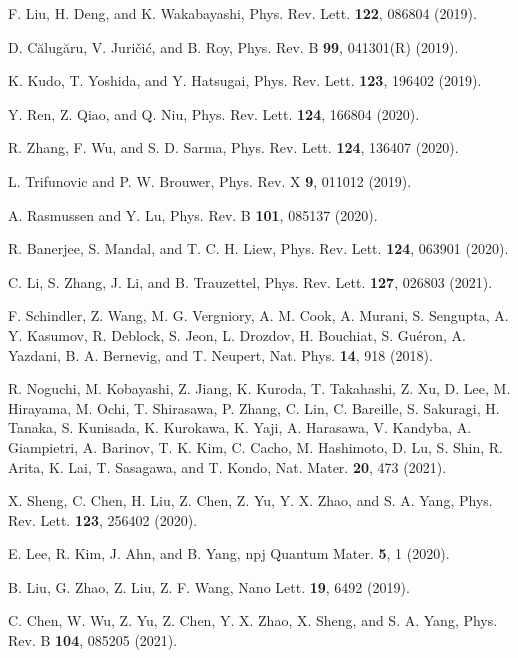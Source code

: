 \documentclass[aps,prl,twocolumn,showpacs,superscriptaddress]{revtex4-1}
\begin{document}
\begin{thebibliography}{99}
F. Liu, H. Deng, and K. Wakabayashi, Phys. Rev. Lett. \textbf{122}, 086804 (2019).

D. C\u{a}lug\u{a}ru, V. Juri\v{c}i\'{c}, and B. Roy, Phys. Rev. B \textbf{99}, 041301(R) (2019).%

K. Kudo, T. Yoshida, and Y. Hatsugai, Phys. Rev. Lett. \textbf{123}, 196402 (2019).

Y. Ren, Z. Qiao, and Q. Niu, Phys. Rev. Lett. \textbf{124}, 166804 (2020).

R. Zhang, F. Wu, and S. D. Sarma, Phys. Rev. Lett. \textbf{124}, 136407 (2020).

L. Trifunovic and P. W. Brouwer, Phys. Rev. X \textbf{9}, 011012 (2019).

A. Rasmussen and Y. Lu, Phys. Rev. B \textbf{101}, 085137 (2020).

R. Banerjee, S. Mandal, and T. C. H. Liew, Phys. Rev. Lett. \textbf{124}, 063901 (2020).

C. Li, S. Zhang, J. Li, and B. Trauzettel, Phys. Rev. Lett. \textbf{127}, 026803 (2021).

F. Schindler, Z. Wang, M. G. Vergniory, A. M. Cook, A. Murani, S. Sengupta, A. Y. Kasumov, R. Deblock, S. Jeon, L. Drozdov, H. Bouchiat, S. Gu\'{e}ron, A. Yazdani, B. A. Bernevig, and T. Neupert, Nat. Phys. \textbf{14}, 918 (2018).

R. Noguchi, M. Kobayashi, Z. Jiang, K. Kuroda, T. Takahashi, Z. Xu, D. Lee, M. Hirayama, M. Ochi, T. Shirasawa, P. Zhang, C. Lin, C. Bareille, S. Sakuragi, H. Tanaka, S. Kunisada, K. Kurokawa, K. Yaji, A. Harasawa, V. Kandyba, A. Giampietri, A. Barinov, T. K. Kim, C. Cacho, M. Hashimoto, D. Lu, S. Shin, R. Arita, K. Lai, T. Sasagawa, and T. Kondo, Nat. Mater. \textbf{20}, 473 (2021).

X. Sheng, C. Chen, H. Liu, Z. Chen, Z. Yu, Y. X. Zhao, and S. A. Yang, Phys. Rev. Lett. \textbf{123}, 256402 (2020).

E. Lee, R. Kim, J. Ahn, and B. Yang, npj Quantum Mater. \textbf{5}, 1 (2020).

B. Liu, G. Zhao, Z. Liu, Z. F. Wang, Nano Lett. \textbf{19}, 6492 (2019).

C. Chen, W. Wu, Z. Yu, Z. Chen, Y. X. Zhao, X. Sheng, and S. A. Yang, Phys. Rev. B \textbf{104}, 085205 (2021).


\end{thebibliography}
\end{document}
